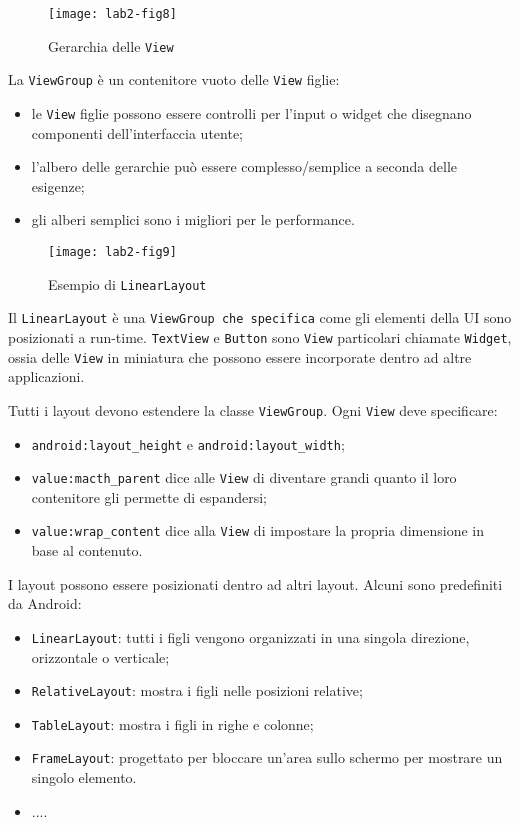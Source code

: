 \begin{figure}[htbp]
        \centering
        \texttt{[image: lab2-fig8]}
        \caption[Gerarchia View]{Gerarchia delle
\texttt{View}}\label{img:lab2-fig8}
\end{figure}

La \texttt{ViewGroup} è un contenitore vuoto delle \texttt{View} figlie:
\begin{itemize}
\item le \texttt{View} figlie possono essere controlli per l'input o widget che
disegnano componenti dell'interfaccia utente;
\item l'albero delle gerarchie può essere complesso/semplice a seconda delle
esigenze;
\item gli alberi semplici sono i migliori per le performance.
\end{itemize}

\begin{figure*}[htbp]
        \centering
        \texttt{[image: lab2-fig9]}
        \caption[LinearLayout]{Esempio di \texttt{LinearLayout}}
        \label{img:lab2-fig9}
\end{figure*}

Il \texttt{LinearLayout} è una \texttt{ViewGroup che specifica} come gli
elementi della UI sono posizionati a run-time. \texttt{TextView} e
\texttt{Button} sono \texttt{View} particolari chiamate \texttt{Widget}, ossia
delle \texttt{View} in miniatura che possono essere incorporate dentro ad altre
applicazioni.

Tutti i layout devono estendere la classe \texttt{ViewGroup}. Ogni \texttt{View}
deve specificare:
\begin{itemize}
\item \texttt{android:layout\_height} e \texttt{android:layout\_width};
\item \texttt{value:macth\_parent} dice alle \texttt{View} di diventare grandi
quanto il loro contenitore gli permette di espandersi;
\item \texttt{value:wrap\_content} dice alla \texttt{View} di impostare la
propria dimensione in base al contenuto.
\end{itemize}

I layout possono essere posizionati dentro ad altri layout. Alcuni sono
predefiniti da Android:

\begin{itemize}
\item \texttt{LinearLayout}: tutti i figli vengono organizzati in una singola
direzione, orizzontale o verticale;
\item \texttt{RelativeLayout}: mostra i figli nelle posizioni relative;
\item \texttt{TableLayout}: mostra i figli in righe e colonne;
\item \texttt{FrameLayout}: progettato per bloccare un'area sullo schermo per
mostrare un singolo elemento.
\item ....
\end{itemize}

